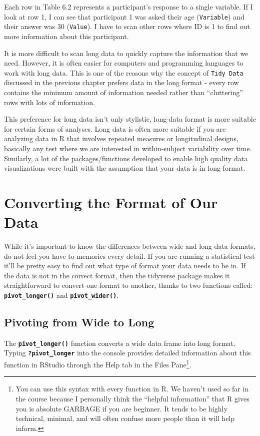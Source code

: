 \documentclass[
]{book}
\begin{document}
Each row in Table 6.2 represents a participant's response to a single variable. If I look at row 1, I can see that participant 1 was asked their age (\texttt{Variable}) and their answer was 30 (\texttt{Value}). I have to scan other rows where ID is 1 to find out more information about this participant.

It is more difficult to scan long data to quickly capture the information that we need. However, it is often easier for computers and programming languages to work with long data. This is one of the reasons why the concept of \texttt{Tidy\ Data} discussed in the previous chapter prefers data in the long format - every row contains the minimum amount of information needed rather than ``cluttering'' rows with lots of information.

This preference for long data isn't only stylistic, long-data format is more suitable for certain forms of analyses. Long data is often more suitable if you are analyzing data in R that involves repeated measures or longitudinal designs, basically any test where we are interested in within-subject variability over time. Similarly, a lot of the packages/functions developed to enable high quality data visualizations were built with the assumption that your data is in long-format.

\hypertarget{converting-the-format-of-our-data}{%
\section{Converting the Format of Our Data}\label{converting-the-format-of-our-data}}

While it's important to know the differences between wide and long data formats, do not feel you have to memories every detail. If you are running a statistical test it'll be pretty easy to find out what type of format your data needs to be in. If the data is not in the correct format, then the tidyverse package makes it straightforward to convert one format to another, thanks to two functions called: \textbf{\texttt{pivot\_longer()}} and \textbf{\texttt{pivot\_wider()}}.

\hypertarget{pivoting-from-wide-to-long}{%
\subsection{Pivoting from Wide to Long}\label{pivoting-from-wide-to-long}}

The \textbf{\texttt{pivot\_longer()}} function converts a wide data frame into long format. Typing \textbf{\texttt{?pivot\_longer}} into the console provides detailed information about this function in RStudio through the Help tab in the Files Pane\footnote{You can use this syntax with every function in R. We haven't used so far in the course because I personally think the ``helpful information'' that R gives you is absolute GARBAGE if you are beginner. It tends to be highly technical, minimal, and will often confuse more people than it will help inform.}.
\end{document}
